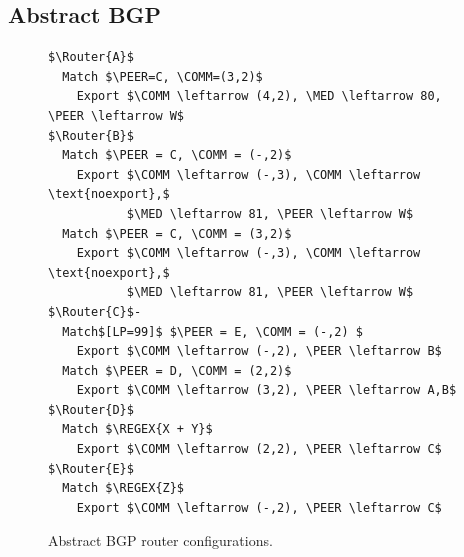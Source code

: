 \subsection{Abstract BGP}


\newcommand{\highlight}[1]{%
  \colorbox{red!50}{$\displaystyle#1$}}
\newcommand{\Router}[1]{ \textbf{Router #1:} }
\newcommand{\REGEX}[1]{ \text{regex}(#1) }
\newcommand{\PEER}{ \text{peer} }
\newcommand{\COMM} {\text{comm}}
\newcommand{\MED} {\text{MED}}

\begin{figure}[t!]
\begin{lstlisting}[frame=single, mathescape=true]
$\Router{A}$
  Match $\PEER=C, \COMM=(3,2)$
    Export $\COMM \leftarrow (4,2), \MED \leftarrow 80, \PEER \leftarrow W$
$\Router{B}$
  Match $\PEER = C, \COMM = (-,2)$
    Export $\COMM \leftarrow (-,3), \COMM \leftarrow \text{noexport},$
           $\MED \leftarrow 81, \PEER \leftarrow W$
  Match $\PEER = C, \COMM = (3,2)$
    Export $\COMM \leftarrow (-,3), \COMM \leftarrow \text{noexport},$
           $\MED \leftarrow 81, \PEER \leftarrow W$
$\Router{C}$-
  Match$[LP=99]$ $\PEER = E, \COMM = (-,2) $
    Export $\COMM \leftarrow (-,2), \PEER \leftarrow B$
  Match $\PEER = D, \COMM = (2,2)$
    Export $\COMM \leftarrow (3,2), \PEER \leftarrow A,B$
$\Router{D}$
  Match $\REGEX{X + Y}$
    Export $\COMM \leftarrow (2,2), \PEER \leftarrow C$
$\Router{E}$
  Match $\REGEX{Z}$
    Export $\COMM \leftarrow (-,2), \PEER \leftarrow C$
\end{lstlisting}
\label{fig:config}
\caption{Abstract BGP router configurations.}
\end{figure}



